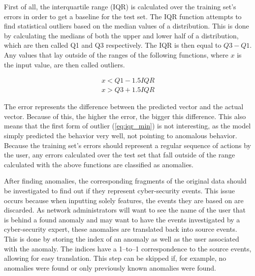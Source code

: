 First of all, the interquartile range (IQR) is calculated over the training set's errors in order to get a baseline for the test set. The IQR function attempts to find statistical outliers based on the median values of a distribution. This is done by calculating the medians of both the upper and lower half of a distribution, which are then called Q1 and Q3 respectively. The IQR is then equal to \(Q3 - Q1\). Any values that lay outside of the ranges of the following functions, where \(x\) is the input value, are then called outliers.

\begin{subequations}
\begin{align}
	x < Q1 - 1.5 IQR \label{eq:iqr_min} \\
	x > Q3 + 1.5 IQR \label{eq:iqr_max}
\end{align}
\end{subequations}

The error represents the difference between the predicted vector and the actual vector. Because of this, the higher the error, the bigger this difference. This also means that the first form of outlier (\ref{eq:iqr_min}) is not interesting, as the model simply predicted the behavior very well, not pointing to anomalous behavior. Because the training set's errors should represent a regular sequence of actions by the user, any errors calculated over the test set that fall outside of the range calculated with the above functions are classified as anomalies.

After finding anomalies, the corresponding fragments of the original data should be investigated to find out if they represent cyber-security events. This issue occurs because when inputting solely features, the events they are based on are discarded. As network administrators will want to see the name of the user that is behind a found anomaly and may want to have the events investigated by a cyber-security expert, these anomalies are translated back into source events. This is done by storing the index of an anomaly as well as the user associated with the anomaly. The indices have a 1--to--1 correspondence to the source events, allowing for easy translation. This step can be skipped if, for example, no anomalies were found or only previously known anomalies were found.

